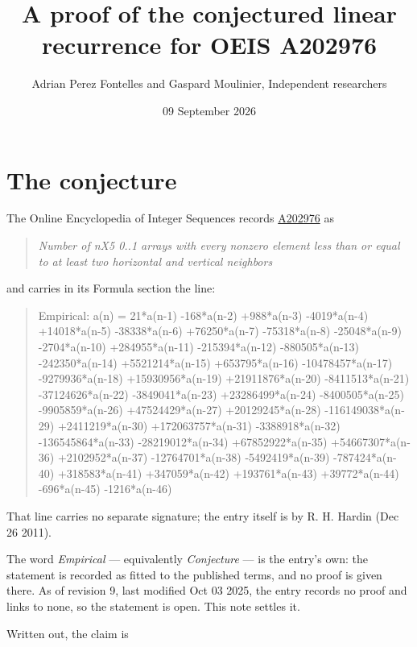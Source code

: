 \documentclass[11pt]{article}
\title{A proof of the conjectured linear recurrence for OEIS A202976}
\author{Adrian Perez Fontelles and Gaspard Moulinier, Independent researchers}
\date{09 September 2026}
\theoremstyle{definition}
\begin{document}
\maketitle
\section{The conjecture}

The Online Encyclopedia of Integer Sequences records \href{https://oeis.org/A202976}{A202976} as

\begin{quote}\itshape Number of nX5 0..1 arrays with every nonzero element less than or equal to at least two horizontal and vertical neighbors\end{quote}

and carries in its Formula section the line:

\begin{quote}\ttfamily Empirical: a(n) = 21*a(n-1) -168*a(n-2) +988*a(n-3) -4019*a(n-4) +14018*a(n-5) -38338*a(n-6) +76250*a(n-7) -75318*a(n-8) -25048*a(n-9) -2704*a(n-10) +284955*a(n-11) -215394*a(n-12) -880505*a(n-13) -242350*a(n-14) +5521214*a(n-15) +653795*a(n-16) -10478457*a(n-17) -9279936*a(n-18) +15930956*a(n-19) +21911876*a(n-20) -8411513*a(n-21) -37124626*a(n-22) -3849041*a(n-23) +23286499*a(n-24) -8400505*a(n-25) -9905859*a(n-26) +47524429*a(n-27) +20129245*a(n-28) -116149038*a(n-29) +2411219*a(n-30) +172063757*a(n-31) -3388918*a(n-32) -136545864*a(n-33) -28219012*a(n-34) +67852922*a(n-35) +54667307*a(n-36) +2102952*a(n-37) -12764701*a(n-38) -5492419*a(n-39) -787424*a(n-40) +318583*a(n-41) +347059*a(n-42) +193761*a(n-43) +39772*a(n-44) -696*a(n-45) -1216*a(n-46)\end{quote}

That line carries no separate signature; the entry itself is by R. H. Hardin (Dec 26 2011).

The word {\itshape Empirical} --- equivalently {\itshape Conjecture} --- is the entry's own: the statement is recorded as fitted to the published terms, and no proof is given there. As of revision 9, last modified Oct 03 2025, the entry records no proof and links to none, so the statement is open. This note settles it.

Written out, the claim is
\end{document}
